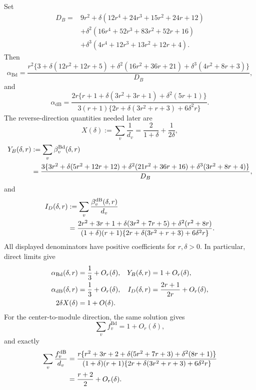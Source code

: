 \documentclass[11pt]{article}
\theoremstyle{definition}
\theoremstyle{remark}
\newcommand{\Bd}{\mathrm{Bd}}
\newcommand{\dB}{\mathrm{dB}}
\begin{document}
Set
\begin{align*}
D_B={}&9r^2
+\delta(12r^4+24r^3+15r^2+24r+12)\\
&+\delta^2(16r^4+52r^3+83r^2+52r+16)\\
&+\delta^3(4r^4+12r^3+13r^2+12r+4).
\end{align*}
Then
\begin{equation}
 \alpha_{\Bd}
 =\frac{r^2\{3+\delta(12r^2+12r+5)
 +\delta^2(16r^2+36r+21)
 +\delta^3(4r^2+8r+3)\}}{D_B},
 \label{eq:alpha-Bd}
\end{equation}
and
\begin{equation}
 \alpha_{\dB}
 =\frac{2r\{r+1+\delta(3r^2+3r+1)+\delta^2(5r+1)\}}
 {3(r+1)\{2r+\delta(3r^2+r+3)+6\delta^2r\}}.
 \label{eq:alpha-dB}
\end{equation}
The reverse-direction quantities needed later are
\begin{equation}
 X(\delta):=\sum_v\frac1{d_v}
 =\frac{2}{1+\delta}+\frac1{2\delta},
 \label{eq:X}
\end{equation}
\begin{align}
 Y_B(\delta,r)&:=\sum_v\beta_v^{\Bd}(\delta,r)\notag\\
 &=\frac{3\{3r^2+\delta(5r^2+12r+12)
 +\delta^2(21r^2+36r+16)
 +\delta^3(3r^2+8r+4)\}}{D_B},
 \label{eq:YB}
\end{align}
and
\begin{align}
 I_D(\delta,r)&:=\sum_v\frac{\beta_v^{\dB}(\delta,r)}{d_v}\notag\\
 &=\frac{2r^2+3r+1+\delta(3r^2+7r+5)+\delta^2(r^2+8r)}
 {(1+\delta)(r+1)\{2r+\delta(3r^2+r+3)+6\delta^2r\}}.
 \label{eq:ID}
\end{align}
All displayed denominators have positive coefficients for $r,\delta>0$.
In particular, direct limits give
\begin{align}
 \alpha_{\Bd}(\delta,r)&=\frac13+O_r(\delta),
 &Y_B(\delta,r)&=1+O_r(\delta),\notag\\
 \alpha_{\dB}(\delta,r)&=\frac13+O_r(\delta),
 &I_D(\delta,r)&=\frac{2r+1}{2r}+O_r(\delta),\notag\\
 2\delta X(\delta)&=1+O(\delta).
 \label{eq:module-limits}
\end{align}
For the center-to-module direction, the same solution gives
\begin{equation}
 \sum_v f_v^{\Bd}=1+O_r(\delta),
 \label{eq:forward-Bd-sum}
\end{equation}
and exactly
\begin{align}
 \sum_v\frac{f_v^{\dB}}{d_v}
 &=\frac{r\{r^2+3r+2+\delta(5r^2+7r+3)+\delta^2(8r+1)\}}
 {(1+\delta)(r+1)\{2r+\delta(3r^2+r+3)+6\delta^2r\}}
 \notag\\
 &=\frac{r+2}{2}+O_r(\delta).
 \label{eq:forward-dB-sum}
\end{align}
\end{document}
